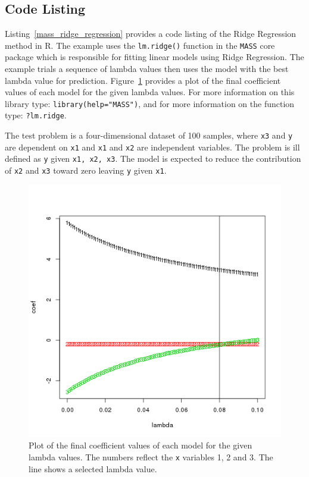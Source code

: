 \subsection{Code Listing}
Listing~\ref{mass_ridge_regression} provides a code listing of the Ridge Regression method in R.
The example uses the \texttt{lm.ridge()} function in the \texttt{MASS} core package which is responsible for fitting linear models using Ridge Regression. The example trials a sequence of lambda values then uses the model with the best lambda value for prediction. Figure~\ref{plot:ridge_regression_result} provides a plot of the final coefficient values of each model for the given lambda values. For more information on this library type: \texttt{library(help="MASS")}, and for more information on the function type: \texttt{?lm.ridge}.

The test problem is a four-dimensional dataset of 100 samples, where \texttt{x3} and \texttt{y} are dependent on \texttt{x1} and \texttt{x1} and \texttt{x2} are independent variables. The problem is ill defined as \texttt{y} given \texttt{x1, x2, x3}. The model is expected to reduce the contribution of \texttt{x2} and \texttt{x3} toward zero leaving \texttt{y} given \texttt{x1}.



\begin{figure}[htp]
\centering
\includegraphics[scale=0.70]{book/a_regularization/ridge_regression_result.png}
\caption{Plot of the final coefficient values of each model for the given lambda values. The numbers reflect the \texttt{x} variables 1, 2 and 3. The line shows a selected lambda value.}
\label{plot:ridge_regression_result}
\end{figure}

